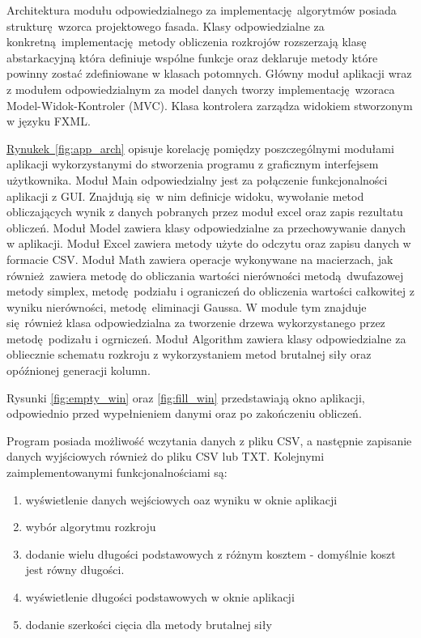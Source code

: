 Architektura modułu odpowiedzialnego za implementację algorytmów posiada strukturę wzorca projektowego fasada. Klasy odpowiedzialne za konkretną implementację metody obliczenia rozkrojów rozszerzają klasę abstarkacyjną która definiuje wspólne funkcje oraz deklaruje metody które powinny zostać zdefiniowane w klasach potomnych. Główny moduł aplikacji wraz z modułem odpowiedzialnym za model danych tworzy implementację wzoraca Model-Widok-Kontroler (MVC). Klasa kontrolera zarządza widokiem stworzonym w języku FXML.

\hyperref[fig:java_arch]{Rynukek~\ref*{fig:app_arch}} opisuje korelację pomiędzy poszczególnymi modułami aplikacji wykorzystanymi do stworzenia programu z graficznym interfejsem użytkownika. Moduł Main odpowiedzialny jest za połączenie funkcjonalności aplikacji z GUI. Znajdują się w nim definicje widoku, wywołanie metod obliczających wynik z danych pobranych przez moduł excel oraz zapis rezultatu obliczeń. Moduł Model zawiera klasy odpowiedzialne za przechowywanie danych w aplikacji. Moduł Excel zawiera metody użyte do odczytu oraz zapisu danych w formacie CSV. Moduł Math zawiera operacje wykonywane na macierzach, jak również zawiera metodę do obliczania wartości nierówności metodą dwufazowej metody simplex, metodę podziału i ograniczeń do obliczenia wartości całkowitej z wyniku nierówności, metodę eliminacji Gaussa. W module tym znajduje się również klasa odpowiedzialna za tworzenie drzewa wykorzystanego przez metodę podizału i ogrniczeń. Moduł Algorithm zawiera klasy odpowiedzialne za obliecznie schematu rozkroju z wykorzystaniem metod brutalnej siły oraz opóźnionej generacji kolumn.

Rysunki \ref{fig:empty_win} oraz \ref{fig:fill_win} przedstawiają okno aplikacji, odpowiednio przed wypełnieniem danymi oraz po zakończeniu obliczeń.

Program posiada możliwość wczytania danych z pliku CSV, a następnie zapisanie danych wyjściowych również do pliku CSV lub TXT. Kolejnymi zaimplementowanymi funkcjonalnościami są:
\begin{enumerate}
  \item wyświetlenie danych wejściowych oaz wyniku w oknie aplikacji
  \item wybór algorytmu rozkroju
  \item dodanie wielu długości podstawowych z różnym kosztem - domyślnie koszt jest równy długości.
  \item wyświetlenie długości podstawowych w oknie aplikacji
  \item dodanie szerkości cięcia dla metody brutalnej siły
\end{enumerate}

